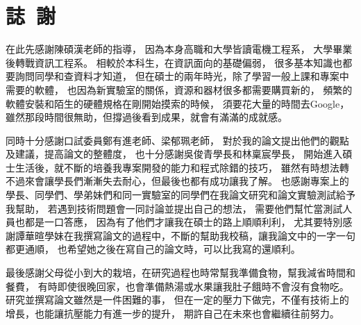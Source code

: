\chapter*{誌~謝~}

\indent
在此先感謝陳碩漢老師的指導，
因為本身高職和大學皆讀電機工程系，
大學畢業後轉戰資訊工程系。
相較於本科生，在資訊面向的基礎偏弱，
很多基本知識也都要詢問同學和查資料才知道，
但在碩士的兩年時光，除了學習一般上課和專案中需要的軟體，
也因為新實驗室的關係，資源和器材很多都需要購買新的，
頻繁的軟體安裝和陌生的硬體規格在剛開始摸索的時候，
須要花大量的時間去Google，
雖然那段時間很無助，但撐過後看到成果，就會有滿滿的成就感。

同時十分感謝口試委員鄭有進老師、梁郁珮老師，
對於我的論文提出他們的觀點及建議，提高論文的整體度，
也十分感謝吳俊青學長和林稟宸學長，
開始進入碩士生活後，就不斷的培養我專案開發的能力和程式除錯的技巧，
雖然有時想法轉不過來會讓學長們漸漸失去耐心，但最後也都有成功讓我了解。
也感謝專案上的學長、同學們、學弟妹們和同一實驗室的同學們在我論文研究和論文實驗測試給予我幫助，
若遇到技術問題會一同討論並提出自己的想法，
需要他們幫忙當測試人員也都是一口答應，
因為有了他們才讓我在碩士的路上順順利利，
尤其要特別感謝譚華暄學妹在我撰寫論文的過程中，不斷的幫助我校稿，讓我論文中的一字一句都更通順，
也希望她之後在寫自己的論文時，可以比我寫的還順利。

最後感謝父母從小到大的栽培，在研究過程也時常幫我準備食物，幫我減省時間和餐費，
有時即使很晚回家，也會準備熱湯或水果讓我肚子餓時不會沒有食物吃。
研究並撰寫論文雖然是一件困難的事，
但在一定的壓力下做完，不僅有技術上的增長，也能讓抗壓能力有進一步的提升，
期許自己在未來也會繼續往前努力。